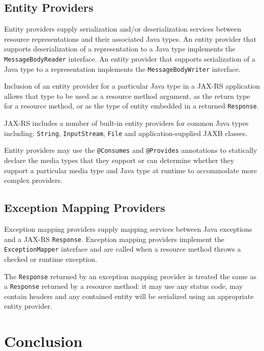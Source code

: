 \documentclass{acm_proc_article-sp}
\begin{document}
\subsection{Entity Providers}

Entity providers supply serialization and/or deserialization services between resource representations and their associated Java types. An entity provider that supports deserialization of a representation to a Java type implements the \texttt{Message\-Body\-Reader} interface. An entity provider that supports serialization of a Java type to a representation implements the \texttt{Message\-Body\-Writer} interface.

Inclusion of an entity provider for a particular Java type in a JAX-RS application allows that type to be used as a resource method argument, as the return type for a resource method, or as the type of entity embedded in a returned \texttt{Response}.

JAX-RS includes a number of built-in entity providers for common Java types including: \texttt{String}, \texttt{InputStream}, \texttt{File} and application-supplied JAXB classes.

Entity providers may use the \texttt{@Consumes} and \texttt{@Provides} annotations to statically declare the media types that they support or can determine whether they support a particular media type and Java type at runtime to accommodate more complex providers.

\subsection{Exception Mapping Providers}
\label{exceptionmapping}

Exception mapping providers supply mapping services between Java exceptions and a JAX-RS \texttt{Response}. Exception mapping providers implement the \texttt{ExceptionMapper} interface and are called when a resource method throws a checked or runtime exception.

\balancecolumns

The \texttt{Response} returned by an exception mapping provider is treated the same as a \texttt{Response} returned by a resource method: it may use any status code, may contain headers and any contained entity will be serialized using an appropriate entity provider.

\section{Conclusion}
\end{document}
